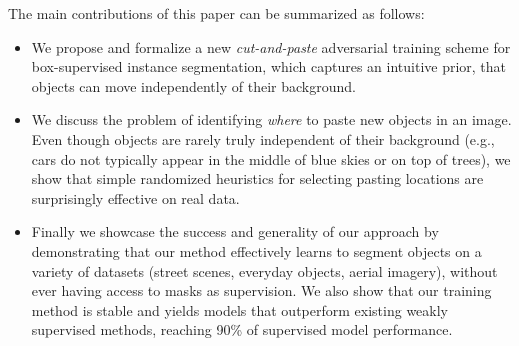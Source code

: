 \documentclass[runningheads]{llncs}
\begin{document}
The main contributions of this paper can be summarized as follows:
\vspace{-1mm}\begin{itemize}%
\item We propose and formalize 
a new \emph{cut-and-paste} adversarial
training scheme for box-supervised instance segmentation, which captures an intuitive prior, that objects can move independently of their background.  
\vspace{1mm}
\item We discuss the problem of identifying \emph{where} to paste
new objects in an image.
Even though objects are rarely truly independent of their background (e.g., cars do not typically appear in the middle of blue skies or on top of trees), we show that simple randomized
heuristics for selecting pasting locations
are surprisingly effective on real data.
\vspace{1mm}
\item 
Finally we showcase the success and generality of our approach by 
demonstrating that our method effectively learns to segment objects 
on a variety of datasets (street scenes, everyday objects, aerial imagery), without ever having access
to masks as supervision.  We also show
that our training method is stable and
yields models that outperform existing weakly supervised methods, reaching 90\% of supervised model performance.
\end{itemize}%
\end{document}
